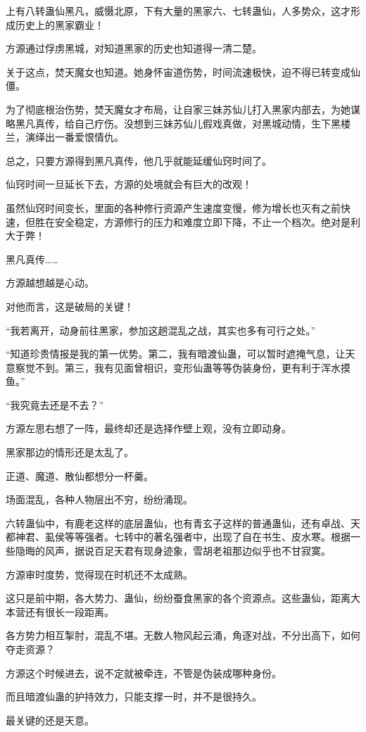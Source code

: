 \begin{this_body}
上有八转蛊仙黑凡，威慑北原，下有大量的黑家六、七转蛊仙，人多势众，这才形成历史上的黑家霸业！

方源通过俘虏黑城，对知道黑家的历史也知道得一清二楚。

关于这点，焚天魔女也知道。她身怀宙道伤势，时间流速极快，迫不得已转变成仙僵。

为了彻底根治伤势，焚天魔女才布局，让自家三妹苏仙儿打入黑家内部去，为她谋略黑凡真传，给自己疗伤。没想到三妹苏仙儿假戏真做，对黑城动情，生下黑楼兰，演绎出一番爱恨情仇。

总之，只要方源得到黑凡真传，他几乎就能延缓仙窍时间了。

仙窍时间一旦延长下去，方源的处境就会有巨大的改观！

虽然仙窍时间变长，里面的各种修行资源产生速度变慢，修为增长也灭有之前快速，但胜在安全稳定，方源修行的压力和难度立即下降，不止一个档次。绝对是利大于弊！

黑凡真传……

方源越想越是心动。

对他而言，这是破局的关键！

“我若离开，动身前往黑家，参加这趟混乱之战，其实也多有可行之处。”

“知道珍贵情报是我的第一优势。第二，我有暗渡仙蛊，可以暂时遮掩气息，让天意察觉不到。第三，我有见面曾相识，变形仙蛊等等伪装身份，更有利于浑水摸鱼。”

“我究竟去还是不去？”

方源左思右想了一阵，最终却还是选择作壁上观，没有立即动身。

黑家那边的情形还是太乱了。

正道、魔道、散仙都想分一杯羹。

场面混乱，各种人物层出不穷，纷纷涌现。

六转蛊仙中，有鹿老这样的底层蛊仙，也有青玄子这样的普通蛊仙，还有卓战、天都神君、虱侯等等强者。七转中的著名强者中，出现了自在书生、皮水寒。根据一些隐晦的风声，据说百足天君有现身迹象，雪胡老祖那边似乎也不甘寂寞。

方源审时度势，觉得现在时机还不太成熟。

这只是前中期，各大势力、蛊仙，纷纷蚕食黑家的各个资源点。这些蛊仙，距离大本营还有很长一段距离。

各方势力相互掣肘，混乱不堪。无数人物风起云涌，角逐对战，不分出高下，如何夺走资源？

方源这个时候进去，说不定就被牵连，不管是伪装成哪种身份。

而且暗渡仙蛊的护持效力，只能支撑一时，并不是很持久。

最关键的还是天意。


\end{this_body}

